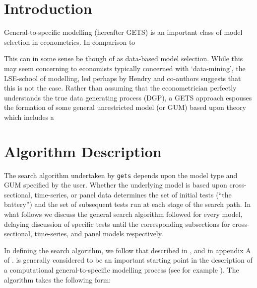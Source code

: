 \documentclass{article}[11pt]
\begin{document}
\begin{spacing}{1.2}
\section{Introduction}
General-to-specific modelling (hereafter GETS) is an important class of model selection in econometrics.
In comparison to 

This can in some sense be though of as data-based model selection.  While this may seem concerning to
economists typically concerned with `data-mining', the LSE-school of modelling, led perhaps by Hendry 
and co-authors suggests that this is not the case.  Rather than assuming that the econometrician perfectly
understands the true data generating process (DGP), a GETS approach espouses the formation of some general 
unrestricted model (or GUM) based upon theory which includes a 


\section{Algorithm Description}
The search algorithm undertaken by \texttt{gets} depends upon the model type and GUM specified by the
user.  Whether the underlying model is based upon cross-sectional, time-series, or panel data determines
the set of initial tests (``the battery'') and the set of subsequent tests run at each stage of the search
path.  In what follows we discuss the general search algorithm followed for every model, delaying discussion
of specific tests until the corresponding subsections for cross-sectional, time-series, and panel models
respectively.

In defining the search algorithm, we follow that described in \citet{HooverPerez1999}, and in appendix A of
\citet{HooverPerez2004}.  \citet{HooverPerez1999} is generally considered to be an important starting point
in the description of a computational general-to-specific modelling process (see for example 
\citet{Camposetal2005}).  The algorithm takes the following form:


\end{spacing}
\end{document}
